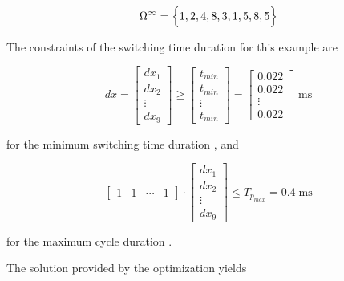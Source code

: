 \noindent
\begin{equation}
    \Omega^\infty = \Big\{ 1, 2, 4, 8, 3, 1, 5, 8, 5 \Big\} \\
    \nonumber
\end{equation}

The constraints of the switching time duration for this example are

\begin{equation}
    dx = 
    \left[
        \begin{matrix}
            dx_1 \\
            dx_2 \\
            \vdots \\
            dx_9
        \end{matrix}
    \right]
    \ge 
    \left[
        \begin{matrix}
            t_{min} \\
            t_{min} \\
            \vdots \\
            t_{min}
        \end{matrix}
    \right]
    =
    \left[
        \begin{matrix}
            0.022 \\
            0.022 \\
            \vdots \\
            0.022
        \end{matrix}
    \right] \;\mathrm{ms}
\end{equation}

\noindent
for the minimum switching time duration , and 

\begin{equation}
    \left[
        \begin{matrix}
            1 & 1 & \dotsm & 1
        \end{matrix}
    \right]
    \cdot
    \left[
    \begin{matrix}
        dx_1 \\
        dx_2 \\
        \vdots \\
        dx_9
    \end{matrix}
    \right]
    \le
    T_{p_{max}}
    =
    0.4 \;\mathrm{ms}
\end{equation}

\noindent
for the maximum cycle duration .

The solution provided by the  optimization yields

